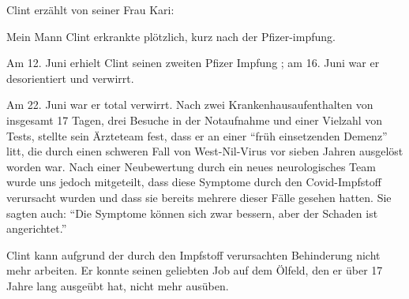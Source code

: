 Clint erzählt von seiner Frau Kari:

Mein Mann Clint erkrankte plötzlich, kurz nach der Pfizer-impfung.

Am 12. Juni erhielt Clint seinen zweiten Pfizer Impfung ; am 16. Juni war er
desorientiert und verwirrt.

Am 22. Juni war er total verwirrt. Nach zwei Krankenhausaufenthalten von
insgesamt 17 Tagen, drei Besuche in der Notaufnahme und einer Vielzahl von
Tests, stellte sein Ärzteteam fest, dass er an einer ``früh einsetzenden
Demenz'' litt, die durch einen schweren Fall von West-Nil-Virus vor sieben
Jahren ausgelöst worden war. Nach einer Neubewertung durch ein neues
neurologisches Team wurde uns jedoch mitgeteilt, dass diese Symptome durch den
Covid-Impfstoff verursacht wurden und dass sie bereits mehrere dieser Fälle
gesehen hatten. Sie sagten auch: ``Die Symptome können sich zwar bessern, aber
der Schaden ist angerichtet.''

Clint kann aufgrund der durch den Impfstoff verursachten Behinderung nicht mehr
arbeiten. Er konnte seinen geliebten Job auf dem Ölfeld, den er über 17 Jahre
lang ausgeübt hat, nicht mehr ausüben.
